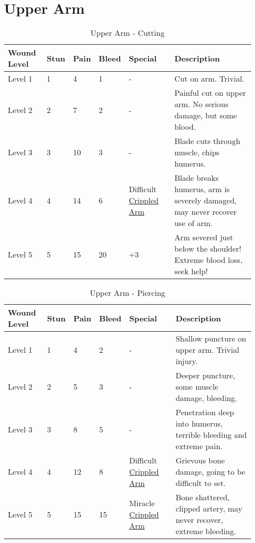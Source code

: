 \documentclass[oneside,11pt,english]{book}
\begin{document}
\section{Upper Arm} \vspace{-25pt} \label{sec:upper-arm}
\begin{table}[hb] %
	\caption{Upper Arm - Cutting}
	\label{wound:Upper Arm - Cutting}
	\begin{tabu} to 
Wound Level &Stun &Pain &Bleed &Special &Description\\\toprule
Level 1& 1& 4& 1& - &Cut on arm. Trivial.\\
Level 2& 2& 7& 2& - &Painful cut on upper arm. No serious damage, but some blood.\\
Level 3& 3& 10& 3& - &Blade cuts through muscle, chips humerus.\\
Level 4& 4& 14& 6& Difficult~ \hyperref[bane:Crippled Limb/Appendage]{Crippled Arm} &Blade breaks humerus, arm is severely damaged, may never recover use of arm.\\
Level 5& 5& 15& 20&
	 \newline
	 +3 &Arm severed just below the shoulder! Extreme blood loss, seek help!\\
	\end{tabu}
\end{table}

\begin{table}[hb] %
	\caption{Upper Arm - Piercing}
	\label{wound:Upper Arm - Piercing}
	\begin{tabu} to 
Wound Level &Stun &Pain &Bleed &Special &Description\\\toprule
Level 1& 1& 4& 2& - &Shallow puncture on upper arm. Trivial injury.\\
Level 2& 2& 5& 3& - &Deeper puncture, some muscle damage, bleeding.\\
Level 3& 3& 8& 5& - &Penetration deep into humerus, terrible bleeding and extreme pain.\\
Level 4& 4& 12& 8&Difficult~ \hyperref[bane:Crippled Limb/Appendage]{Crippled Arm} &Grievous bone damage, going to be difficult to set.\\
Level 5& 5& 15& 15&Miracle~ \hyperref[bane:Crippled Limb/Appendage]{Crippled Arm}&Bone shattered, clipped artery, may never recover, extreme bleeding.\\
	\end{tabu}
\end{table}
\end{document}
